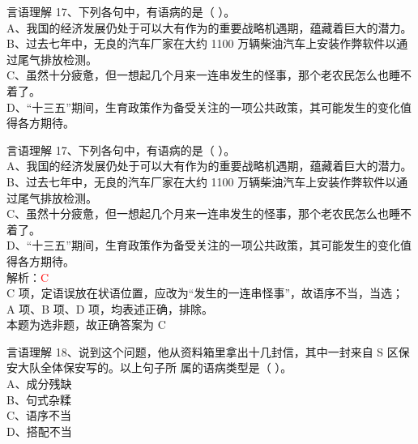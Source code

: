 \documentclass[aspectratio=169]{beamer}
\begin{document}
\begin{frame}[t]{言语理解}
17、下列各句中，有语病的是（ ）。\\
A、我国的经济发展仍处于可以大有作为的重要战略机遇期，蕴藏着巨大的潜力。\\
B、过去七年中，无良的汽车厂家在大约 1100 万辆柴油汽车上安装作弊软件以通过尾气排放检测。\\
C、虽然十分疲惫，但一想起几个月来一连串发生的怪事，那个老农民怎么也睡不着了。\\
D、“十三五”期间，生育政策作为备受关注的一项公共政策，其可能发生的变化值得各方期待。\\
\end{frame}



\begin{frame}[t]{言语理解}
    17、下列各句中，有语病的是（ ）。\\
    A、我国的经济发展仍处于可以大有作为的重要战略机遇期，蕴藏着巨大的潜力。\\
    B、过去七年中，无良的汽车厂家在大约 1100 万辆柴油汽车上安装作弊软件以通过尾气排放检测。\\
    C、虽然十分疲惫，但一想起几个月来一连串发生的怪事，那个老农民怎么也睡不着了。\\
    D、“十三五”期间，生育政策作为备受关注的一项公共政策，其可能发生的变化值得各方期待。\\

    解析：\textcolor{red}{C}\\
    C 项，定语误放在状语位置，应改为“发生的一连串怪事”，故语序不当，当选；\\
    A 项、B 项、D 项，均表述正确，排除。\\
    本题为选非题，故正确答案为 C\\
\end{frame}



\begin{frame}[t]{言语理解}
18、说到这个问题，他从资料箱里拿出十几封信，其中一封来自 S 区保安大队全体保安写的。以上句子所
属的语病类型是（ ）。\\
A、成分残缺\\
B、句式杂糅\\
C、语序不当\\
D、搭配不当 \\
\end{frame}
\end{document}
